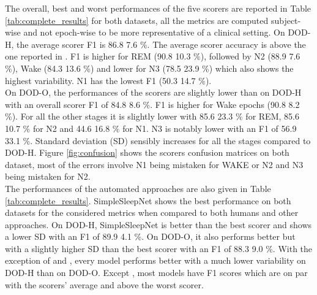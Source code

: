 \documentclass[journal]{IEEEtran}
\begin{document}
The overall, best and worst performances of the five scorers are reported in Table \ref{tab:complete_results} for both datasets, all the metrics are computed subject-wise and not epoch-wise to be more representative of a clinical setting. On DOD-H, the average scorer F1 is 86.8  7.6 \%. The average scorer accuracy is above the one reported in \cite{Danker-Hopfe2009InterraterStandard}. F1 is higher for REM (90.8  10.3 \%), followed by N2 (88.9  7.6 \%), Wake (84.3  13.6 \%) and lower for N3 (78.5  23.9 \%) which also shows the highest variability. N1 has the lowest F1 (50.3  14.7 \%).\\
On DOD-O, the performances of the scorers are slightly lower than on DOD-H with an overall scorer F1 of 84.8  8.6 \%. F1 is higher for Wake epochs (90.8  8.2 \%). For all the other stages it is slightly lower with 85.6  23.3 \% for REM, 85.6  10.7 \% for N2 and 44.6  16.8 \% for N1. N3 is notably lower with an F1 of 56.9  33.1 \%. Standard deviation (SD) sensibly increases for all the stages compared to DOD-H. Figure \ref{fig:confusion} shows the scorers confusion matrices on both dataset, most of the errors involve N1 being mistaken for WAKE or N2 and N3 being mistaken for N2.\\
The performances of the automated approaches are also given in Table \ref{tab:complete_results}. SimpleSleepNet shows the best performance on both datasets for the considered metrics when compared to both humans and other approaches. On DOD-H, SimpleSleepNet is better than the best scorer and shows a lower SD with an F1 of 89.9  4.1 \%. On DOD-O, it also performs better but with a slightly higher SD than the best scorer with an F1 of 88.3  9.0 \%. With the exception of \cite{Chambon2018} and \cite{Tsinalis2016a}, every model performs better  with a much lower variability on DOD-H than on DOD-O. Except \cite{Tsinalis2016a}, most models have F1 scores which are on par with the scorers' average and above the worst scorer.
\end{document}
